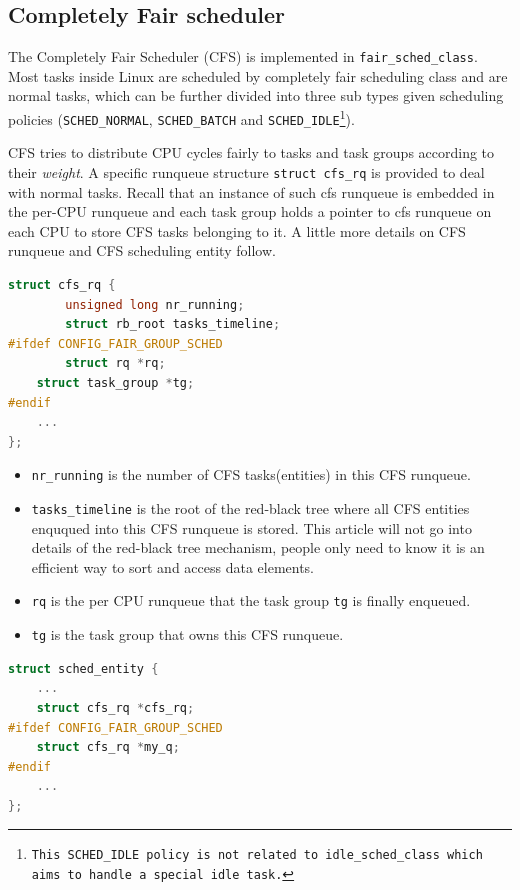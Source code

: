 \subsection{Completely Fair scheduler\label{sec:LinuxSched_cfs}}

The Completely Fair Scheduler (CFS) is implemented in
\texttt{fair\_sched\_class}.  Most tasks inside Linux are scheduled by
completely fair scheduling class and are normal tasks, which can be
further divided into three sub types given scheduling policies
(\texttt{SCHED\_NORMAL}, \texttt{SCHED\_BATCH} and
\texttt{SCHED\_IDLE\footnote{This SCHED\_IDLE policy is not related to
    idle\_sched\_class which aims to handle a special idle task.}}).

CFS tries to distribute CPU cycles fairly to tasks and task groups
according to their \emph{weight}. A specific runqueue structure
\texttt{struct cfs\_rq} is provided to deal with normal tasks.  Recall
that an instance of such cfs runqueue is embedded in the per-CPU
runqueue and each task group holds a pointer to cfs runqueue on each
CPU to store CFS tasks belonging to it.  A little more details on CFS
runqueue and CFS scheduling entity follow.
\begin{lstlisting}[language=C,
		caption={\texttt{The CFS runqueue}},
		label={cfsrunqueue}]
struct cfs_rq {
        unsigned long nr_running;
        struct rb_root tasks_timeline;
#ifdef CONFIG_FAIR_GROUP_SCHED
        struct rq *rq;  
	struct task_group *tg;
#endif
	...
};
\end{lstlisting}
\begin{itemize}
\item \texttt{nr\_running} is the number of CFS tasks(entities) in this CFS 
	runqueue.
\item \texttt{tasks\_timeline} is the root of the red-black tree 
	\cite{rbtree} where 
	all CFS entities enququed into this CFS runqueue is stored. 
	This article will not go into details of the red-black tree
	mechanism, people only need to know it is an efficient way 
	to sort and access data elements.
\item \texttt{rq} is the per CPU runqueue that the task group \texttt{tg} 
	is finally enqueued.
\item \texttt{tg} is the task group that owns this CFS runqueue.
\end{itemize}
\begin{lstlisting}[language=C,
			caption={\texttt{The CFS scheduling entity}},
			label={sched_entity}]
struct sched_entity {
	...
	struct cfs_rq *cfs_rq;
#ifdef CONFIG_FAIR_GROUP_SCHED
	struct cfs_rq *my_q;
#endif
	...
}; 
\end{lstlisting}
